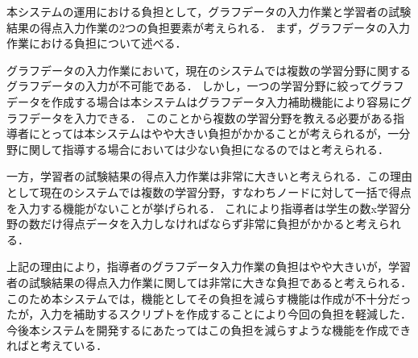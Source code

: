 本システムの運用における負担として，グラフデータの入力作業と学習者の試験結果の得点入力作業の2つの負担要素が考えられる．
まず，グラフデータの入力作業における負担について述べる．

グラフデータの入力作業において，現在のシステムでは複数の学習分野に関するグラフデータの入力が不可能である．
しかし，一つの学習分野に絞ってグラフデータを作成する場合は本システムはグラフデータ入力補助機能により容易にグラフデータを入力できる．
このことから複数の学習分野を教える必要がある指導者にとっては本システムはやや大きい負担がかかることが考えられるが，一分野に関して指導する場合においては少ない負担になるのではと考えられる．

一方，学習者の試験結果の得点入力作業は非常に大きいと考えられる．この理由として現在のシステムでは複数の学習分野，すなわちノードに対して一括で得点を入力する機能がないことが挙げられる．
これにより指導者は学生の数x学習分野の数だけ得点データを入力しなければならず非常に負担がかかると考えられる．

上記の理由により，指導者のグラフデータ入力作業の負担はやや大きいが，学習者の試験結果の得点入力作業に関しては非常に大きな負担であると考えられる．
このため本システムでは，機能としてその負担を減らす機能は作成が不十分だったが，入力を補助するスクリプトを作成することにより今回の負担を軽減した．
今後本システムを開発するにあたってはこの負担を減らすような機能を作成できればと考えている．